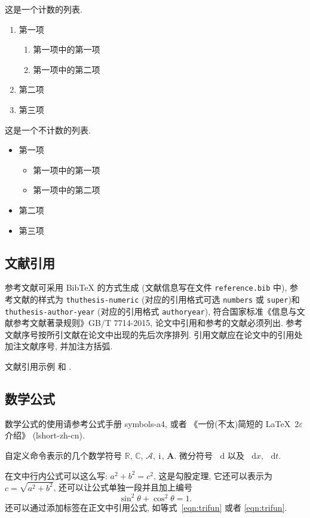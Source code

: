 \documentclass[zihao=-4,twoside,final]{ctexart}
\numberwithin{equation}{section}
\numberwithin{figure}{section}
\numberwithin{table}{section}
\theoremstyle{plain}
\newcommand{\dif}{\mathop{}\!\mathrm{d}}
\newcommand{\CC}{\ensuremath{\mathbb{C}}}
\newcommand{\RR}{\ensuremath{\mathbb{R}}}
\newcommand{\dx}[1][x]{\mathop{}\!\mathrm{d}#1}
\newcommand{\ii}{\mathrm{i}\mkern1mu} %
\newcommand{\A}{\mathcal{A}}
\newcommand{\bA}{\boldsymbol{A}}
\begin{document}
这是一个计数的列表.
\begin{enumerate}%
  \item 第一项
    \begin{enumerate}
      \item 第一项中的第一项
      \item 第一项中的第二项
    \end{enumerate}
  \item 第二项
  \item 第三项
\end{enumerate}


这是一个不计数的列表.
\begin{itemize}%
  \item 第一项
  \begin{itemize}
    \item 第一项中的第一项
    \item 第一项中的第二项
  \end{itemize}
  \item 第二项
  \item 第三项
\end{itemize}



\subsection{文献引用}

参考文献可采用 BibTeX 的方式生成 (文献信息写在文件 \verb|reference.bib| 中), 参考文献的样式为 \verb|thuthesis-numeric| (对应的引用格式可选 \verb|numbers| 或  \verb|super|)和 \verb|thuthesis-author-year| (对应的引用格式 \verb|authoryear|), 符合国家标准《信息与文献参考文献著录规则》GB/T 7714-2015, 论文中引用和参考的文献必须列出. 参考文献序号按所引文献在论文中出现的先后次序排列. 引用文献应在论文中的引用处加注文献序号, 并加注方括弧.

文献引用示例 \cite{LiLiu1997} 和 \cite{Adams2003,Shen1994}.


\subsection{数学公式}

数学公式的使用请参考公式手册 symbols-a4, 或者 《一份(不太)简短的 \LaTeX~2$\varepsilon$ 介绍》 (lshort-zh-cn).

自定义命令表示的几个数学符号 $\RR$, $\CC$, $\A$, $\ii$, $\bA$. 微分符号 $\dif$ 以及 $\dx$, $\dx[t]$.

在文中行内公式可以这么写: $a^2+b^2=c^2$, 这是勾股定理, 它还可以表示为 $c=\sqrt{a^2+b^2}$, 还可以让公式单独一段并且加上编号
\begin{equation}\label{eqn:trifun}
\sin^2{\theta}+\cos^2{\theta}=1.
\end{equation}
还可以通过添加标签在正文中引用公式, 如等式~\eqref{eqn:trifun} 或者 \ref{eqn:trifun}.
\end{document}
